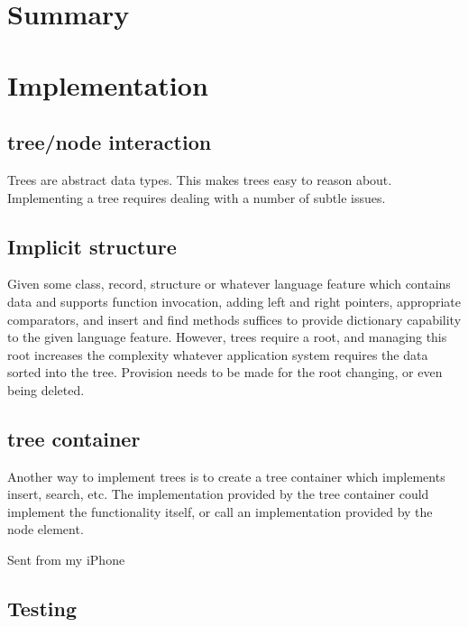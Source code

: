 \documentclass{article}
\begin{document}
{}


\section{Summary}

\appendix

\section{Implementation}

\subsection{tree/node interaction}

Trees are abstract data types. This makes trees easy to reason about.
Implementing a tree requires dealing with a number of subtle issues.

\subsection{Implicit structure}

Given some class, record, structure or whatever language feature which contains
data and supports function invocation, adding left and right pointers,
appropriate comparators, and insert and find methods suffices to provide
dictionary capability to the given language feature. However, trees require a
root, and managing this root increases the complexity whatever application
system requires the data sorted into the tree. Provision needs to be made for
the root changing, or even being deleted.

\subsection{tree container}

Another way to implement trees is to create a tree container which implements
insert, search, etc. The implementation provided by the tree container could
implement the functionality itself, or call an implementation provided by
the node element.



Sent from my iPhone

\subsection{Testing}
\end{document}
